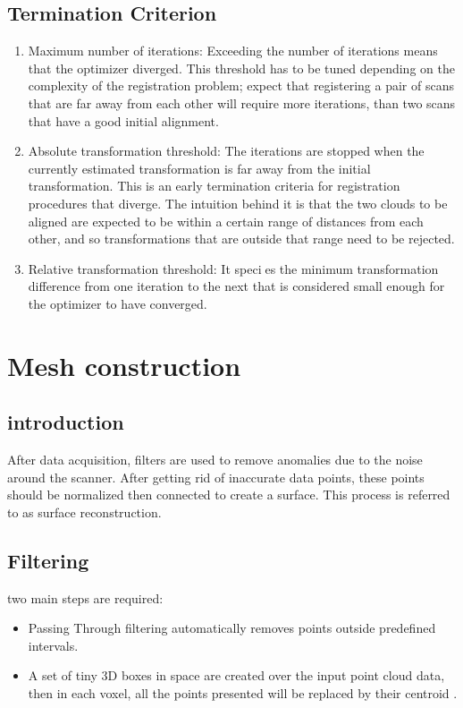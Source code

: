 \documentclass[a4paper]{report}
\begin{document}
\section{Termination Criterion}
\begin{enumerate}
\item Maximum number of iterations: Exceeding the number of iterations means that the
optimizer diverged. This threshold has to be tuned depending on the complexity of
the registration problem; expect that registering a pair of scans that are far away
from each other will require more iterations, than two scans that have a good initial
alignment.

\item Absolute transformation threshold: The iterations are stopped when the currently
estimated transformation is far away from the initial transformation. This is an
early termination criteria for registration procedures that diverge. The intuition
behind it is that the two clouds to be aligned are expected to be within a certain
range of distances from each other, and so transformations that are outside that
range need to be rejected.

\item Relative transformation threshold: It species the minimum transformation difference
from one iteration to the next that is considered small enough for the optimizer to have converged.


\end{enumerate}\cite{proj3}




\chapter{Mesh construction}
\section{introduction}
After data acquisition, filters are used to remove anomalies due to the noise around the scanner. After getting rid of inaccurate data points, these points should be normalized then connected to create a surface. This process is referred to as surface reconstruction.
\section{Filtering}
two main steps are required:
\begin{itemize}
\item Passing Through filtering automatically
removes points outside predefined intervals.

\item A set of tiny 3D boxes in space are created 
over the input point cloud data, then in each voxel, all the points presented will be replaced by their centroid \cite{proj1}.
\end{itemize}
\end{document}
